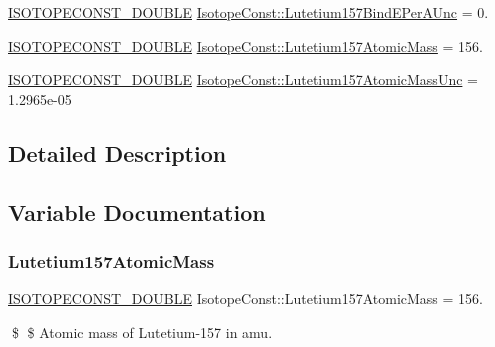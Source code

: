 \begin{DoxyCompactItemize}
\mbox{\hyperlink{group___isotope_const-_macros_ga8f45a7272ce02c0b4c65c44636ed719a}{I\+S\+O\+T\+O\+P\+E\+C\+O\+N\+S\+T\+\_\+\+D\+O\+U\+B\+LE}} \mbox{\hyperlink{group___isotope_const-_lutetium-_lu157_gaa732378ce091ecb31e1f0983d9542c47}{Isotope\+Const\+::\+Lutetium157\+Bind\+E\+Per\+A\+Unc}} = 0.
\item 
\mbox{\hyperlink{group___isotope_const-_macros_ga8f45a7272ce02c0b4c65c44636ed719a}{I\+S\+O\+T\+O\+P\+E\+C\+O\+N\+S\+T\+\_\+\+D\+O\+U\+B\+LE}} \mbox{\hyperlink{group___isotope_const-_lutetium-_lu157_ga55c4f7edb6b80d1c6f9abdb7f67d52fa}{Isotope\+Const\+::\+Lutetium157\+Atomic\+Mass}} = 156.
\item 
\mbox{\hyperlink{group___isotope_const-_macros_ga8f45a7272ce02c0b4c65c44636ed719a}{I\+S\+O\+T\+O\+P\+E\+C\+O\+N\+S\+T\+\_\+\+D\+O\+U\+B\+LE}} \mbox{\hyperlink{group___isotope_const-_lutetium-_lu157_ga74c63d5d0ba55e6358e2399fb6852155}{Isotope\+Const\+::\+Lutetium157\+Atomic\+Mass\+Unc}} = 1.\+2965e-\/05
\end{DoxyCompactItemize}


\subsection{Detailed Description}


\subsection{Variable Documentation}
\mbox{\label{group___isotope_const-_lutetium-_lu157_ga55c4f7edb6b80d1c6f9abdb7f67d52fa}} 
\subsubsection{\texorpdfstring{Lutetium157\+Atomic\+Mass}{Lutetium157AtomicMass}}
{\footnotesize\ttfamily \mbox{\hyperlink{group___isotope_const-_macros_ga8f45a7272ce02c0b4c65c44636ed719a}{I\+S\+O\+T\+O\+P\+E\+C\+O\+N\+S\+T\+\_\+\+D\+O\+U\+B\+LE}} Isotope\+Const\+::\+Lutetium157\+Atomic\+Mass = 156.}

\$ \$ Atomic mass of Lutetium-\/157 in amu. \mbox{\label{group___isotope_const-_lutetium-_lu157_ga74c63d5d0ba55e6358e2399fb6852155}} 
